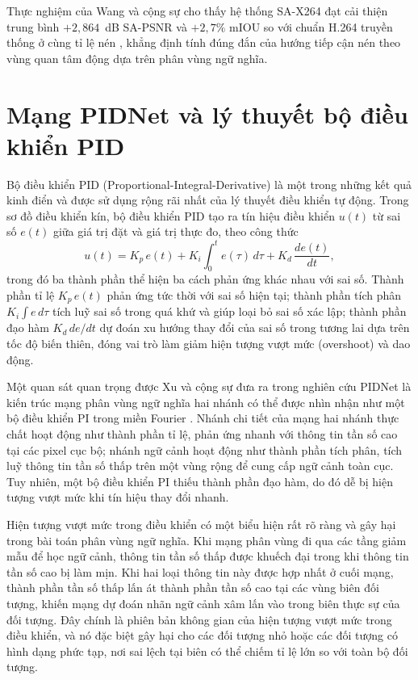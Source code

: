 Thực nghiệm của Wang và cộng sự cho thấy hệ thống SA-X264 đạt cải thiện trung bình $+2{,}864$~dB SA-PSNR và $+2{,}7\%$ mIOU so với chuẩn H.264 truyền thống ở cùng tỉ lệ nén \cite{SAC}, khẳng định tính đúng đắn của hướng tiếp cận nén theo vùng quan tâm động dựa trên phân vùng ngữ nghĩa.

\section{Mạng PIDNet và lý thuyết bộ điều khiển PID}

Bộ điều khiển PID (Proportional-Integral-Derivative) là một trong những kết quả kinh điển và được sử dụng rộng rãi nhất của lý thuyết điều khiển tự động. Trong sơ đồ điều khiển kín, bộ điều khiển PID tạo ra tín hiệu điều khiển $u(t)$ từ sai số $e(t)$ giữa giá trị đặt và giá trị thực đo, theo công thức
\begin{equation}
  u(t) = K_p \, e(t) + K_i \int_{0}^{t} e(\tau) \, d\tau + K_d \, \frac{de(t)}{dt},
\end{equation}
trong đó ba thành phần thể hiện ba cách phản ứng khác nhau với sai số. Thành phần tỉ lệ $K_p \, e(t)$ phản ứng tức thời với sai số hiện tại; thành phần tích phân $K_i \int e \, d\tau$ tích luỹ sai số trong quá khứ và giúp loại bỏ sai số xác lập; thành phần đạo hàm $K_d \, de/dt$ dự đoán xu hướng thay đổi của sai số trong tương lai dựa trên tốc độ biến thiên, đóng vai trò làm giảm hiện tượng vượt mức (overshoot) và dao động.

Một quan sát quan trọng được Xu và cộng sự đưa ra trong nghiên cứu PIDNet là kiến trúc mạng phân vùng ngữ nghĩa hai nhánh có thể được nhìn nhận như một bộ điều khiển PI trong miền Fourier \cite{PID}. Nhánh chi tiết của mạng hai nhánh thực chất hoạt động như thành phần tỉ lệ, phản ứng nhanh với thông tin tần số cao tại các pixel cục bộ; nhánh ngữ cảnh hoạt động như thành phần tích phân, tích luỹ thông tin tần số thấp trên một vùng rộng để cung cấp ngữ cảnh toàn cục. Tuy nhiên, một bộ điều khiển PI thiếu thành phần đạo hàm, do đó dễ bị hiện tượng vượt mức khi tín hiệu thay đổi nhanh.

Hiện tượng vượt mức trong điều khiển có một biểu hiện rất rõ ràng và gây hại trong bài toán phân vùng ngữ nghĩa. Khi mạng phân vùng đi qua các tầng giảm mẫu để học ngữ cảnh, thông tin tần số thấp được khuếch đại trong khi thông tin tần số cao bị làm mịn. Khi hai loại thông tin này được hợp nhất ở cuối mạng, thành phần tần số thấp lấn át thành phần tần số cao tại các vùng biên đối tượng, khiến mạng dự đoán nhãn ngữ cảnh xâm lấn vào trong biên thực sự của đối tượng. Đây chính là phiên bản không gian của hiện tượng vượt mức trong điều khiển, và nó đặc biệt gây hại cho các đối tượng nhỏ hoặc các đối tượng có hình dạng phức tạp, nơi sai lệch tại biên có thể chiếm tỉ lệ lớn so với toàn bộ đối tượng.


